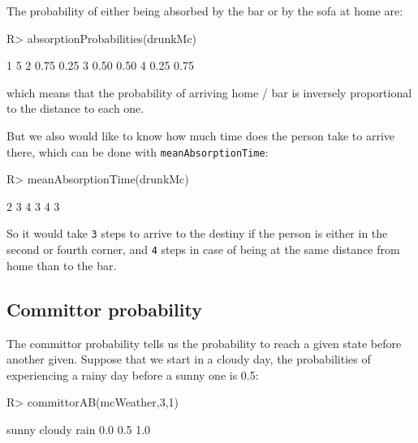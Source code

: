 \documentclass[
  nojss]{jss}
\begin{document}
The probability of either being absorbed by the bar or by the sofa at home are:

\begin{CodeChunk}

\begin{CodeInput}
R> absorptionProbabilities(drunkMc)
\end{CodeInput}

\begin{CodeOutput}
     1    5
2 0.75 0.25
3 0.50 0.50
4 0.25 0.75
\end{CodeOutput}
\end{CodeChunk}

which means that the probability of arriving home / bar is inversely proportional to the distance to each one.

But we also would like to know how much time does the person take to arrive there, which can be done with \texttt{meanAbsorptionTime}:

\begin{CodeChunk}

\begin{CodeInput}
R> meanAbsorptionTime(drunkMc)
\end{CodeInput}

\begin{CodeOutput}
2 3 4 
3 4 3 
\end{CodeOutput}
\end{CodeChunk}

So it would take \texttt{3} steps to arrive to the destiny if the person is either in the second or fourth corner, and \texttt{4} steps in case of being at the same distance from home than to the bar.

\hypertarget{committor-probability}{%
\subsection{Committor probability}\label{committor-probability}}

The committor probability tells us the probability to reach a given state before another given.
Suppose that we start in a cloudy day, the probabilities of experiencing a rainy day before
a sunny one is 0.5:

\begin{CodeChunk}

\begin{CodeInput}
R> committorAB(mcWeather,3,1)
\end{CodeInput}

\begin{CodeOutput}
 sunny cloudy   rain 
   0.0    0.5    1.0 
\end{CodeOutput}
\end{CodeChunk}
\end{document}
